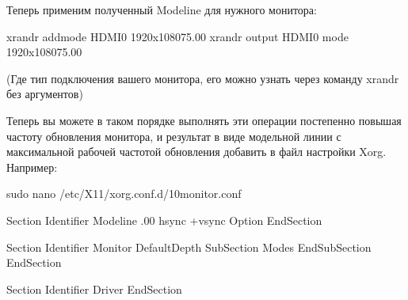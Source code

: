 \documentclass[letterpaper,10pt,russian,openany]{sphinxmanual}
\begin{document}
\sphinxAtStartPar
Теперь применим полученный Modeline для нужного монитора:

\begin{sphinxVerbatim}[commandchars=\\\{\}]
xrandr \PYGZhy{}\PYGZhy{}addmode HDMI\PYGZhy{}0 1920x1080\PYGZus{}75.00
xrandr \PYGZhy{}\PYGZhy{}output HDMI\PYGZhy{}0 \PYGZhy{}\PYGZhy{}mode 1920x1080\PYGZus{}75.00
\end{sphinxVerbatim}

\sphinxAtStartPar
(Где  \sphinxhyphen{} тип подключения вашего монитора, его можно узнать через команду xrandr без аргументов)

\sphinxAtStartPar
Теперь вы можете в таком порядке выполнять эти операции постепенно повышая частоту обновления монитора, и результат в виде
модельной линии с максимальной рабочей частотой обновления добавить в файл настройки Xorg. Например:

\begin{sphinxVerbatim}[commandchars=\\\{\}]
sudo nano /etc/X11/xorg.conf.d/10\PYGZhy{}monitor.conf 

Section 
    Identifier  
    Modeline   .00           \PYGZhy{}hsync +vsync 
    Option   
EndSection

Section 
    Identifier 
    Monitor  
    DefaultDepth 
    SubSection 
      Modes  
    EndSubSection
EndSection

Section 
    Identifier 
    Driver       
EndSection
\end{sphinxVerbatim}
\end{document}
